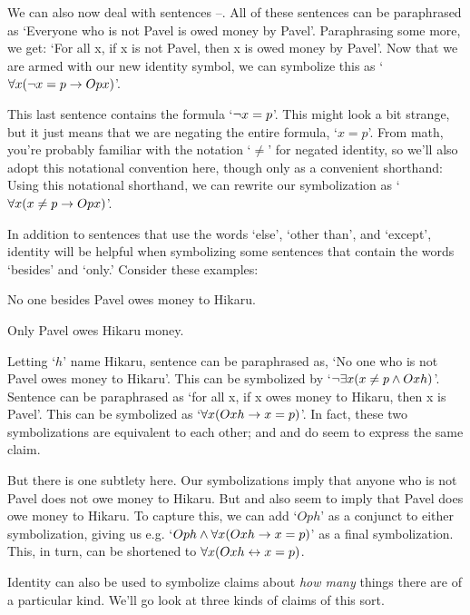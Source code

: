 We can also now deal with sentences --. All of these sentences can be  paraphrased as `Everyone who is not Pavel is owed money by Pavel'. Paraphrasing some more, we get: `For all x, if x is not Pavel, then x is owed money by Pavel'. Now that we are armed with our new identity symbol, we can symbolize this as `$\forall x (\neg x = p \rightarrow Opx)$'.

This last sentence contains the formula `$\neg x = p$'. This might look a bit strange, but it just means that we are negating the entire formula, `$x = p$'.  From math, you're probably familiar with the notation `$\neq$' for negated identity, so we'll also adopt this notational convention here, though only as a convenient shorthand:
Using this notational shorthand, we can rewrite our symbolization as `$\forall x (x \neq p \rightarrow Opx)$'.


In addition to sentences that use the words `else', `other than', and `except', identity will be helpful when symbolizing some sentences that contain the words `besides' and `only.' Consider these examples:

\begin{earg}
\item[\ex{else3}] No one besides Pavel owes money to Hikaru.
\item[\ex{else4}] Only Pavel owes Hikaru money.
\end{earg}
Letting `$h$' name Hikaru, sentence  can be paraphrased as, `No one who is not Pavel owes money to Hikaru'. This can be symbolized by `$\neg\exists x(x \neq p \wedge Oxh)$'. Sentence  can be paraphrased as `for all x, if x owes money to Hikaru, then x is Pavel'. This can be symbolized as `$\forall x (Oxh \rightarrow x = p)$'.  In fact, these two symbolizations are equivalent to each other; and  and  do seem to express the same claim.

But there is one subtlety here.   Our symbolizations imply that anyone who is not Pavel does not owe money to Hikaru.  But  and  also seem to imply that Pavel does owe money to Hikaru.  To capture this, we can add `$Oph$' as a conjunct to either symbolization, giving us e.g. `$Oph \wedge \forall x (Oxh \rightarrow x = p)$' as a final symbolization. This, in turn, can be shortened to $\forall x(Oxh \leftrightarrow x=p)$.


Identity can also be used to symbolize claims about \emph{how many} things there are of a particular kind.  We'll go look at three kinds of claims of this sort.

